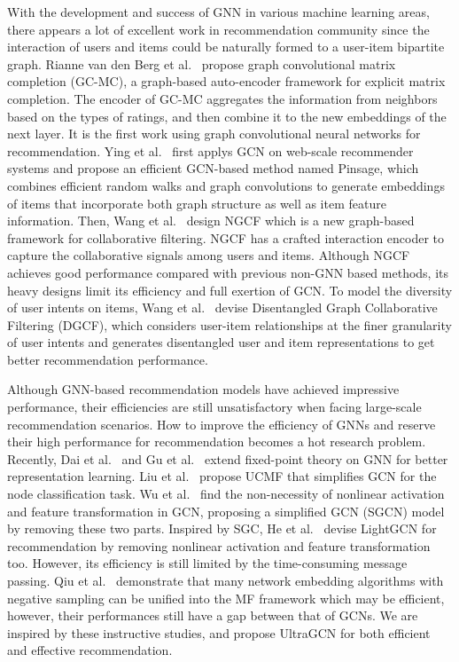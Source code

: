 \documentclass[sigconf,authorversion]{acmart}
\begin{document}
 With the development and success of GNN in various machine learning areas, there appears a lot of excellent work in recommendation community since the interaction of users and items could be naturally formed to a user-item bipartite graph.
 Rianne van den Berg et al.~\cite{GC-MC} propose graph convolutional matrix completion (GC-MC), a graph-based auto-encoder framework for explicit matrix completion. The encoder of GC-MC aggregates the information from neighbors based on the types of ratings, and then combine it to the new embeddings of the next layer. It is the first work using graph convolutional neural networks for recommendation. 
 Ying et al.~\cite{PinSage} first applys GCN on web-scale recommender systems and propose an efficient GCN-based method named Pinsage, which combines efficient random walks and graph convolutions
 to generate embeddings of items that incorporate both graph structure as well as item feature information.
 Then, Wang et al.~\cite{NGCF} design NGCF which is a new graph-based framework for collaborative filtering. NGCF has a crafted interaction encoder to capture the collaborative signals among users and items.  Although NGCF achieves good performance compared with previous non-GNN based methods, its heavy designs limit its efficiency and full exertion of GCN. To model the diversity of user intents on items, Wang et al.~\cite{DGCF} devise Disentangled Graph Collaborative Filtering (DGCF), which considers user-item relationships at the finer granularity of user intents and generates disentangled user and item representations to get better recommendation performance. 
 
Although GNN-based recommendation models have achieved impressive performance, their efficiencies are still unsatisfactory when facing large-scale recommendation scenarios. How to improve the efficiency of GNNs and reserve their high performance for recommendation becomes a hot research problem. Recently,  Dai et al.~\cite{fixed_point_GNN_dai} and Gu et al.~\cite{implicitGNN} extend fixed-point theory on GNN for better representation learning. Liu et al.~\cite{UCMF} propose UCMF that simplifies GCN for the node classification task.
Wu et al.~\cite{SGCN} find the non-necessity of nonlinear activation and feature transformation in GCN, proposing a simplified GCN (SGCN) model by removing these two parts. Inspired by SGC, He et al.~\cite{LightGCN} devise LightGCN for recommendation by removing nonlinear activation and feature transformation too. However, its efficiency is still limited by the time-consuming message passing. Qiu et al.~\cite{unify_network_embedding} demonstrate that many network embedding algorithms with negative sampling can be unified into the MF framework which may be efficient, however, their performances still have a gap between that of GCNs.
We are inspired by these instructive studies, and propose UltraGCN for both efficient and effective recommendation.  
\end{document}

